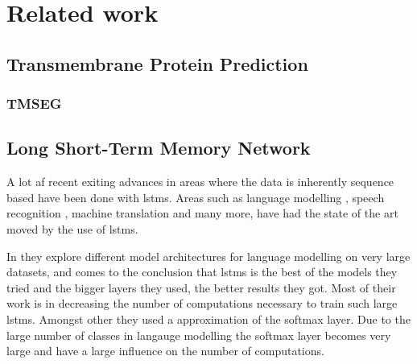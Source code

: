 \section{Related work}

\subsection{Transmembrane Protein Prediction}
% 



\subsubsection{TMSEG}


\subsection{Long Short-Term Memory Network}

A lot af recent exiting advances in areas where the data is inherently sequence based 
have been done with \glspl{lstm}. Areas such as language modelling \cite{JozefowiczEtAl, ShazeerEtAl},
speech recognition \cite{XiongEtAl}, machine translation \cite{WuEtAl} and many more, have had the 
state of the art moved by the use of \glspl{lstm}. 


In \cite{JozefowiczEtAl} they explore different model architectures for language modelling 
on very large datasets, and comes to the conclusion that \glspl{lstm} is the best of the models
they tried and the bigger layers they used, the better results they got. Most of their work is
in decreasing the number of computations necessary to train such large \glspl{lstm}. 
Amongst other they used a approximation of the softmax layer. Due to the large number of 
classes in langauge modelling the softmax layer becomes very large and have a large influence 
on the number of computations. 